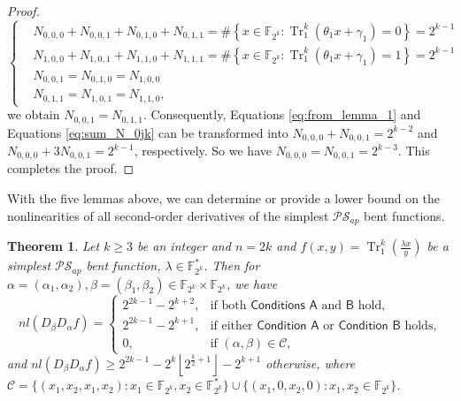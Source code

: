 \documentclass{article}
\newcommand{\F}{\mathbb{F}}
\newcommand{\0}{\textbf{0}}
\newcommand{\1}{\textbf{1}}
\newcommand{\TRACE}{\operatorname{Tr}_1^k}
\theoremstyle{plain}
\newtheorem{theorem}{Theorem}
\begin{document}
\begin{proof}
        \begin{equation}\label{eq:sum_N_0jk}\left\{\begin{alignedat}{2}
            &N_{0,0,0}+N_{0,0,1}+N_{0,1,0}+N_{0,1,1}=\#\left\{x\in\F_{2^k} : \TRACE\left(\theta_1x+\gamma_1\right)=0\right\}=2^{k-1}\\
            &N_{1,0,0}+N_{1,0,1}+N_{1,1,0}+N_{1,1,1}=\#\left\{x\in\F_{2^k} : \TRACE\left(\theta_1x+\gamma_1\right)=1\right\}=2^{k-1}\\
            &N_{0,0,1}=N_{0,1,0}=N_{1,0,0}\\
            &N_{0,1,1}=N_{1,0,1}=N_{1,1,0},
        \end{alignedat}\right.\end{equation}
        we obtain $N_{0,0,1}=N_{0,1,1}$.
        Consequently, Equations \eqref{eq:from_lemma_1} and Equations \eqref{eq:sum_N_0jk} can be transformed into
        $N_{0,0,0}+N_{0,0,1}=2^{k-2}$ and $N_{0,0,0}+3N_{0,0,1}=2^{k-1}$, respectively.
        So we have $N_{0,0,0}=N_{0,0,1}=2^{k-3}$. This completes the proof.
    \end{proof}

    With the five lemmas above, we can determine or provide a lower bound on the nonlinearities of all second-order derivatives of the simplest $\mathcal{PS}_{ap}$ bent functions.
    \begin{theorem}\label{thm:nl_DaDbf}
        Let $k\ge 3$ be an integer and $n=2k$ and $f(x,y)=\TRACE\left(\frac{\lambda x}{y}\right)$ be a simplest $\mathcal{PS}_{ap}$ bent function, $\lambda\in\F_{2^k}^*$.
        Then for $\alpha=(\alpha_1,\alpha_2),\beta=(\beta_1,\beta_2)\in\F_{2^k}\times\F_{2^k}$, we have
        \begin{equation}\label{res:nontrivil_nl}
            nl(D_{\beta}D_{\alpha}f)=\begin{cases}
                2^{2k-1}-2^{k+2},&\text{if both }\hyperref[item_a]{\textsf{Conditions A}}\text{ and }\hyperref[item_b]{\textsf{B}} \text{ hold},\\
                2^{2k-1}-2^{k+1},&\text{if either }\hyperref[item_a]{\textsf{Condition A}}\text{ or }\hyperref[item_b]{\textsf{Condition B}}\text{ holds},\\
                0,&\text{if }(\alpha,\beta)\in \mathcal{C},%
            \end{cases}
        \end{equation}
        and $nl(D_{\beta}D_{\alpha}f)\ge 2^{2k-1}-2^k\left\lfloor 2^{\frac{k}{2}+1}\right\rfloor-2^{k+1}$ otherwise,
        where $\mathcal{C}=\{(x_1,x_2,x_1,x_2):x_1\in\F_{2^k},x_2\in\F_{2^k}^*\}\cup\{(x_1,0,x_2,0):x_1,x_2\in\F_{2^k}\}$.
    \end{theorem}
\end{document}
